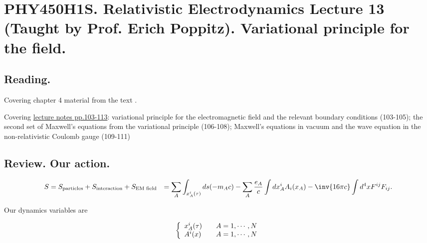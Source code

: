 
%

\chapter{PHY450H1S.  Relativistic Electrodynamics Lecture 13 (Taught by Prof. Erich Poppitz).  Variational principle for the field.}
\label{chap:relativisticElectrodynamicsL13}
{}
\date{Feb 15, 2011}

\beginArtNoToc

\section{Reading.}

Covering chapter 4 material from the text \cite{landau1980classical}.

Covering \href{http://www.physics.utoronto.ca/~poppitz/e-poppitz/PHY450_files/RelEMpp103-113.pdf}{lecture notes pp.103-113}: variational principle for the electromagnetic field and the relevant boundary conditions (103-105); the second set of Maxwell's equations from the variational principle (106-108); Maxwell's equations in vacuum and the wave equation in the non-relativistic Coulomb gauge (109-111)

\section{Review.  Our action.}

\begin{align*}
S
&= S_{\text{particles}} + S_{\text{interaction}} + S_{\text{EM field}}
&= \sum_A \int_{x_A^i(\tau)} ds ( -m_A c )
- \sum_A
\frac{e_A}{c}
\int dx_A^i A_i(x_A)
- \inv{16 \pi c} \int d^4 x F^{ij } F_{ij}.
\end{align*}

Our dynamics variables are

\begin{equation}\label{eqn:relativisticElectrodynamicsL13:30}
\left\{
\begin{array}{l l}
x_A^i(\tau) & \quad \mbox{$A = 1, \cdots, N$} \\
A^i(x) & \quad \mbox{$A = 1, \cdots, N$}
\end{array}
\right.
\end{equation}

